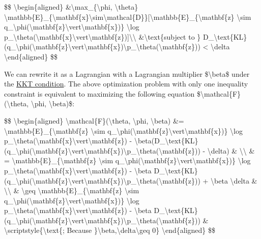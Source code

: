 \$\$ \textbackslash begin\{aligned\} \&\textbackslash max\_\{\textbackslash phi, \textbackslash theta\} \textbackslash mathbb\{E\}\_\{\textbackslash mathbf\{x\}\textbackslash sim\textbackslash mathcal\{D\}\}{[}\textbackslash mathbb\{E\}\_\{\textbackslash mathbf\{z\} \textbackslash sim q\_\textbackslash phi(\textbackslash mathbf\{z\}\textbackslash vert\textbackslash mathbf\{x\})\} \textbackslash log p\_\textbackslash theta(\textbackslash mathbf\{x\}\textbackslash vert\textbackslash mathbf\{z\}){]}\textbackslash\textbackslash{} \&\textbackslash text\{subject to \} D\_\textbackslash text\{KL\}(q\_\textbackslash phi(\textbackslash mathbf\{z\}\textbackslash vert\textbackslash mathbf\{x\})\textbackslash\textbar p\_\textbackslash theta(\textbackslash mathbf\{z\})) \textless{} \textbackslash delta \textbackslash end\{aligned\} \$\$

We can rewrite it as a Lagrangian with a Lagrangian multiplier \$\textbackslash beta\$ under the \href{https://www.cs.cmu.edu/~ggordon/10725-F12/slides/16-kkt.pdf}{KKT condition}. The above optimization problem with only one inequality constraint is equivalent to maximizing the following equation \$\textbackslash mathcal\{F\}(\textbackslash theta, \textbackslash phi, \textbackslash beta)\$:

\$\$ \textbackslash begin\{aligned\} \textbackslash mathcal\{F\}(\textbackslash theta, \textbackslash phi, \textbackslash beta) \&= \textbackslash mathbb\{E\}\_\{\textbackslash mathbf\{z\} \textbackslash sim q\_\textbackslash phi(\textbackslash mathbf\{z\}\textbackslash vert\textbackslash mathbf\{x\})\} \textbackslash log p\_\textbackslash theta(\textbackslash mathbf\{x\}\textbackslash vert\textbackslash mathbf\{z\}) - \textbackslash beta(D\_\textbackslash text\{KL\}(q\_\textbackslash phi(\textbackslash mathbf\{z\}\textbackslash vert\textbackslash mathbf\{x\})\textbackslash\textbar p\_\textbackslash theta(\textbackslash mathbf\{z\})) - \textbackslash delta) \& \textbackslash\textbackslash{} \& = \textbackslash mathbb\{E\}\_\{\textbackslash mathbf\{z\} \textbackslash sim q\_\textbackslash phi(\textbackslash mathbf\{z\}\textbackslash vert\textbackslash mathbf\{x\})\} \textbackslash log p\_\textbackslash theta(\textbackslash mathbf\{x\}\textbackslash vert\textbackslash mathbf\{z\}) - \textbackslash beta D\_\textbackslash text\{KL\}(q\_\textbackslash phi(\textbackslash mathbf\{z\}\textbackslash vert\textbackslash mathbf\{x\})\textbackslash\textbar p\_\textbackslash theta(\textbackslash mathbf\{z\})) + \textbackslash beta \textbackslash delta \& \textbackslash\textbackslash{} \& \textbackslash geq \textbackslash mathbb\{E\}\_\{\textbackslash mathbf\{z\} \textbackslash sim q\_\textbackslash phi(\textbackslash mathbf\{z\}\textbackslash vert\textbackslash mathbf\{x\})\} \textbackslash log p\_\textbackslash theta(\textbackslash mathbf\{x\}\textbackslash vert\textbackslash mathbf\{z\}) - \textbackslash beta D\_\textbackslash text\{KL\}(q\_\textbackslash phi(\textbackslash mathbf\{z\}\textbackslash vert\textbackslash mathbf\{x\})\textbackslash\textbar p\_\textbackslash theta(\textbackslash mathbf\{z\})) \& \textbackslash scriptstyle\{\textbackslash text\{; Because \}\textbackslash beta,\textbackslash delta\textbackslash geq 0\} \textbackslash end\{aligned\} \$\$

